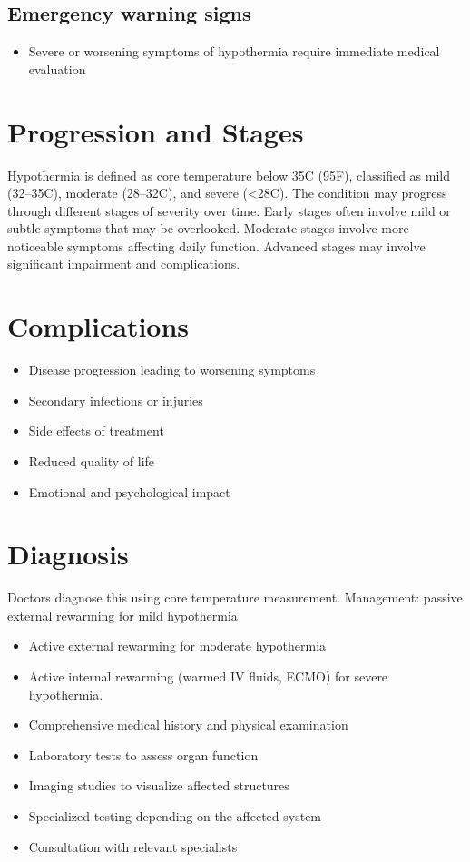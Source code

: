 \subsection{Emergency warning signs}
\begin{itemize}[noitemsep]
  \item Severe or worsening symptoms of hypothermia require immediate medical evaluation
\end{itemize}
\section{Progression and Stages}
Hypothermia is defined as core temperature below 35\textdegree C (95\textdegree F), classified as mild (32--35\textdegree C), moderate (28--32\textdegree C), and severe (<28\textdegree C). The condition may progress through different stages of severity over time. Early stages often involve mild or subtle symptoms that may be overlooked. Moderate stages involve more noticeable symptoms affecting daily function. Advanced stages may involve significant impairment and complications.
\section{Complications}
\begin{itemize}[noitemsep]
  \item Disease progression leading to worsening symptoms
  \item Secondary infections or injuries
  \item Side effects of treatment
  \item Reduced quality of life
  \item Emotional and psychological impact
\end{itemize}
\section{Diagnosis}
Doctors diagnose this using core temperature measurement. Management: passive external rewarming for mild hypothermia

\begin{itemize}[noitemsep]
  \item Active external rewarming for moderate hypothermia
  \item Active internal rewarming (warmed IV fluids, ECMO) for severe hypothermia.
  \item Comprehensive medical history and physical examination
  \item Laboratory tests to assess organ function
  \item Imaging studies to visualize affected structures
  \item Specialized testing depending on the affected system
  \item Consultation with relevant specialists
\end{itemize}
